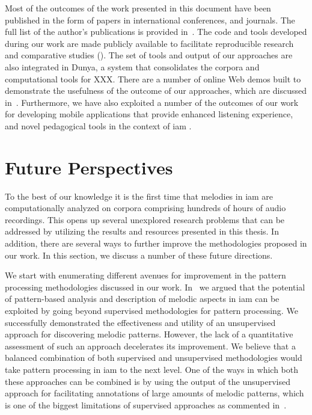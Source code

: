 Most of the outcomes of the work presented in this document have been published in the form of papers in international conferences, and journals. The full list of the author’s publications is provided in~. The code and tools developed during our work are made publicly available to facilitate reproducible research and comparative studies (). The set of tools and output of our approaches are also integrated in Dunya, a system that consolidates the corpora and computational tools for XXX. There are a number of online Web demos built to demonstrate the usefulness of the outcome of our approaches, which are discussed in~\secref{}. Furthermore, we have also exploited a number of the outcomes of our work for developing mobile applications that provide enhanced listening experience, and novel pedagogical tools in the context of \gls{iam} \secref{}.


\section{Future Perspectives}
\label{sec:future_directions}

To the best of our knowledge it is the first time that melodies in \gls{iam} are computationally analyzed on corpora comprising hundreds of hours of audio recordings. This opens up several unexplored research problems that can be addressed by utilizing the results and resources presented in this thesis. In addition, there are several ways to further improve the methodologies proposed in our work. In this section, we discuss a number of these future directions. 

We start with enumerating different avenues for improvement in the pattern processing methodologies discussed in our work. In~ we argued that the potential of pattern-based analysis and description of melodic aspects in \gls{iam} can be exploited by going beyond supervised methodologies for pattern processing. We successfully demonstrated the effectiveness and utility of an unsupervised approach for discovering melodic patterns. However, the lack of a quantitative assessment of such an approach decelerates its improvement. We believe that a balanced combination of both supervised and unsupervised methodologies would take pattern processing in \gls{iam} to the next level. One of the ways in which both these approaches can be combined is by using the output of the unsupervised approach for facilitating annotations of large amounts of melodic patterns, which is one of the biggest limitations of supervised approaches as commented in~.

